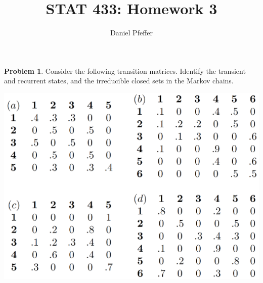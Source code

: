 \documentclass[oneside,reqno]{amsart}
\title{STAT 433: Homework 3}
\author{Daniel Pfeffer}
\theoremstyle{definition}
\newtheorem{prob}{Problem}
\begin{document}
\maketitle


\begin{prob}
Consider the following transition matrices. Identify the transient and recurrent states, and the irreducible closed sets in the Markov chains.
\begin{center}
\includegraphics[scale=0.33]{q1-matrices}
\end{center}
\end{prob}
\end{document}
